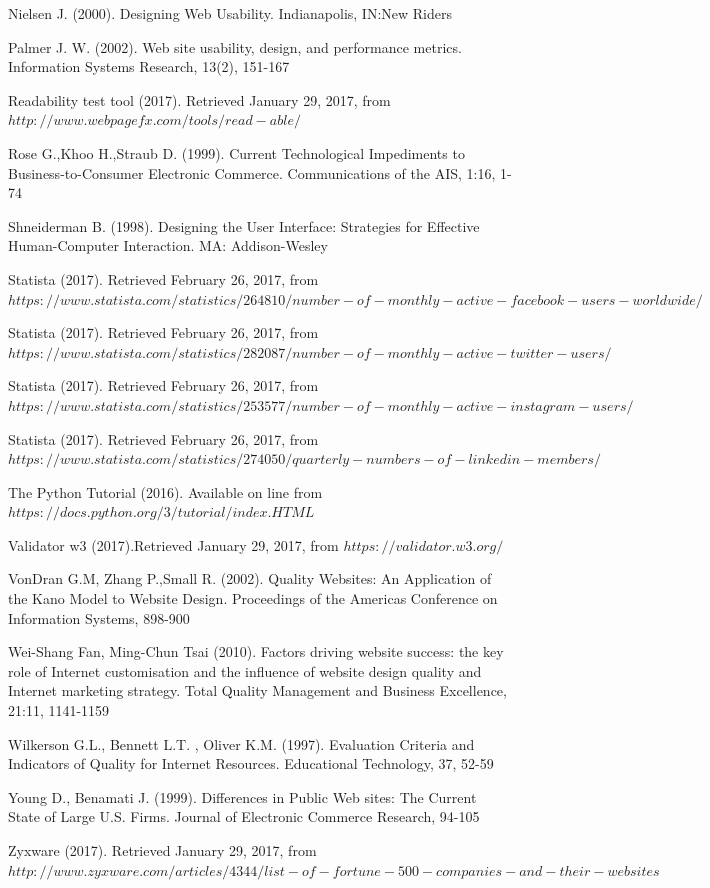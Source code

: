 \documentclass{book}
\begin{document}
\begin{thebibliography}{widest-label}
Nielsen J. (2000). Designing Web Usability. Indianapolis, IN:New Riders

Palmer J. W. (2002). Web site usability, design, and performance metrics. Information Systems Research, 13(2), 151-167

Readability test tool (2017). Retrieved January 29, 2017, from $http://www.webpagefx.com/tools/read-able/$

Rose G.,Khoo H.,Straub D. (1999). Current Technological Impediments to Business-to-Consumer Electronic
Commerce. Communications of the AIS, 1:16, 1-74

Shneiderman B. (1998). Designing the User Interface: Strategies for Effective Human-Computer Interaction. 
MA: Addison-Wesley

Statista (2017). Retrieved February 26, 2017, from $https://www.statista.com/statistics/264810/number-of-monthly-active-facebook-users-worldwide/$

Statista (2017). Retrieved February 26, 2017, from $https://www.statista.com/statistics/282087/number-of-monthly-active-twitter-users/$

Statista (2017). Retrieved February 26, 2017, from $https://www.statista.com/statistics/253577/number-of-monthly-active-instagram-users/$

Statista (2017). Retrieved February 26, 2017, from $https://www.statista.com/statistics/274050/quarterly-numbers-of-linkedin-members/$

The Python Tutorial (2016). Available on line from $https://docs.python.org/3/tutorial/index.HTML$


Validator w3 (2017).Retrieved January 29, 2017, from $https://validator.w3.org/$

VonDran G.M, Zhang P.,Small R. (2002). Quality
Websites: An Application of the Kano Model to Website Design. Proceedings of the Americas Conference on Information Systems, 898-900

Wei-Shang Fan, Ming-Chun Tsai (2010). Factors driving website success: the key role of Internet customisation and the influence of website design quality and Internet
marketing strategy. Total Quality Management and Business Excellence, 21:11, 1141-1159

Wilkerson G.L., Bennett L.T. , Oliver K.M. (1997). Evaluation Criteria and Indicators of Quality for Internet Resources. Educational Technology, 37, 52-59

Young D., Benamati J. (1999). Differences in Public Web sites: The Current State of Large U.S. Firms. Journal of Electronic Commerce Research, 94-105

Zyxware (2017). Retrieved January 29, 2017, from $http://www.zyxware.com/articles/4344/list-of-fortune-500-companies-and-their-websites$
\end{thebibliography}
\newpage
\appendix
\end{document}
